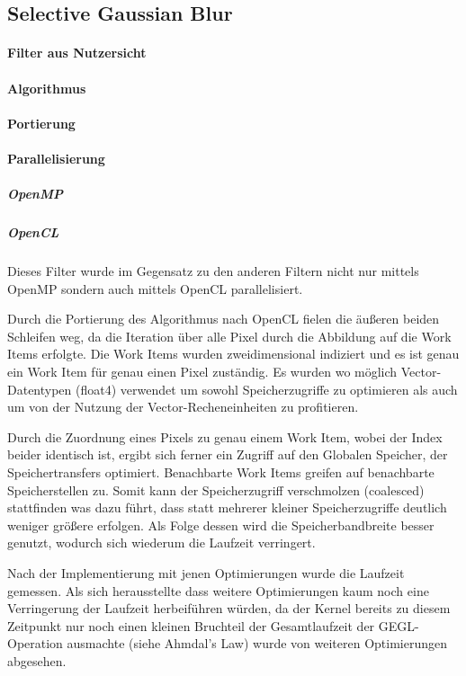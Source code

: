 \documentclass[10pt,a4paper]{article}
\begin{document}









\subsection{Selective Gaussian Blur}
\paragraph{Filter aus Nutzersicht}
\paragraph{Algorithmus} 
\paragraph{Portierung}
\paragraph{Parallelisierung}
\subparagraph{OpenMP}
\subparagraph{OpenCL}
Dieses Filter wurde im Gegensatz zu den anderen Filtern nicht nur mittels OpenMP sondern auch mittels OpenCL parallelisiert. 


Durch die Portierung des Algorithmus nach OpenCL fielen die äußeren beiden Schleifen weg, da die Iteration über alle Pixel durch die Abbildung auf die Work Items erfolgte. Die Work Items wurden zweidimensional indiziert und es ist genau ein Work Item für genau einen Pixel zuständig.
Es wurden wo möglich Vector-Datentypen (float4) verwendet um sowohl Speicherzugriffe zu optimieren als auch um von der Nutzung der Vector-Recheneinheiten zu profitieren.

Durch die Zuordnung eines Pixels zu genau einem Work Item, wobei der Index beider identisch ist, ergibt sich ferner ein Zugriff auf den Globalen Speicher, der Speichertransfers optimiert. Benachbarte Work Items greifen auf benachbarte Speicherstellen zu. Somit kann der Speicherzugriff verschmolzen (coalesced) stattfinden was dazu führt, dass statt mehrerer kleiner Speicherzugriffe deutlich weniger größere erfolgen. Als Folge dessen wird die Speicherbandbreite besser genutzt, wodurch sich wiederum die Laufzeit verringert.

Nach der Implementierung mit jenen Optimierungen wurde die Laufzeit gemessen. Als sich herausstellte dass weitere Optimierungen kaum noch eine Verringerung der Laufzeit herbeiführen würden, da der Kernel bereits zu diesem Zeitpunkt nur noch einen kleinen Bruchteil der Gesamtlaufzeit der GEGL-Operation ausmachte (siehe Ahmdal's Law) wurde von weiteren Optimierungen abgesehen.
\end{document}
